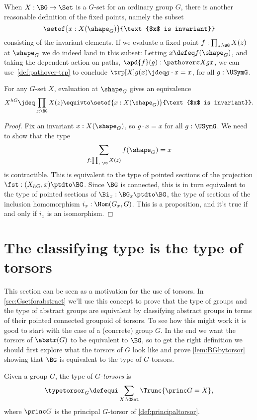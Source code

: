 When $X : \BG \to \Set$ is a $G$-set for an ordinary group $G$,
there is another reasonable definition of the fixed points,
namely the subset
\[
  \setof{x : X(\shape_G)}{\text{$x$ is invariant}}
\]
consisting of the invariant elements.
If we evaluate a fixed point $f : \prod_{z:\BG}X(z)$ at $\shape_G$
we do indeed land in this subset:
Letting $x\defeq f(\shape_G)$,
and taking the dependent action on paths,
$\apd{f}(g) : \pathover x X g x$,
we can use~\cref{def:pathover-trp} to conclude
$\trp[X] g(x)\jdeq g\cdot x = x$, for all $g:\USymG$.

\begin{lemma}\label{lem:fixpts-are-fixed}
  For any $G$-set $X$, evaluation at $\shape_G$ gives an equivalence
  \[
    X^{hG} \jdeq \prod_{z:\BG}X(z) \equivto
    \setof{x : X(\shape_G)}{\text{$x$ is invariant}}.
  \]
\end{lemma}
\begin{proof}
  Fix an invariant $x : X(\shape_G)$,
  so $g\cdot x = x$ for all $g: \USymG$.
  We need to show that the type
  \[
    \sum_{f : \prod_{z:\BG}X(z)}f(\shape_G)=x
  \]
  is contractible.
  This is equivalent to the type of pointed sections
  of the projection $\fst : (X_{hG},x) \ptdto \BG$.
  Since $\BG$ is connected, this is in turn equivalent
  to the type of pointed sections of $\Bi_x : \BG_x \ptdto \BG$,
  \ie the type of sections of the inclusion homomorphism $i_x:\Hom(G_x,G)$.
  This is a proposition, and it's true if and only if $i_x$ is an isomorphism.
\end{proof}

\section{The classifying type is the type of torsors}
This section can be seen as a motivation for the use of torsors.
In \cref{sec:Gsetforabstract} we'll use this concept to prove that the type of groups and the type of abstract groups are equivalent by classifying abstract groups in terms of their pointed connected groupoid of torsors.  To see how this might work it is good to start with the case of a (concrete) group $G$.  In the end we want the torsors of $\abstr(G)$ to be equivalent to $\BG$, so to get the right definition we should first explore what the torsors of $G$ look like and prove \cref{lem:BGbytorsor} showing that $\BG$ is equivalent to the type of $G$-torsors.
\label{sec:torsors}
\begin{definition}
  Given a group  $G$, the type of {\em$G$-torsors} is
$$\typetorsor_G\defequi\sum_{X:\GSet}\Trunc{\princ G=X},$$
where $\princ G$ is the principal $G$-torsor of \cref{def:principaltorsor}.
\end{definition}


